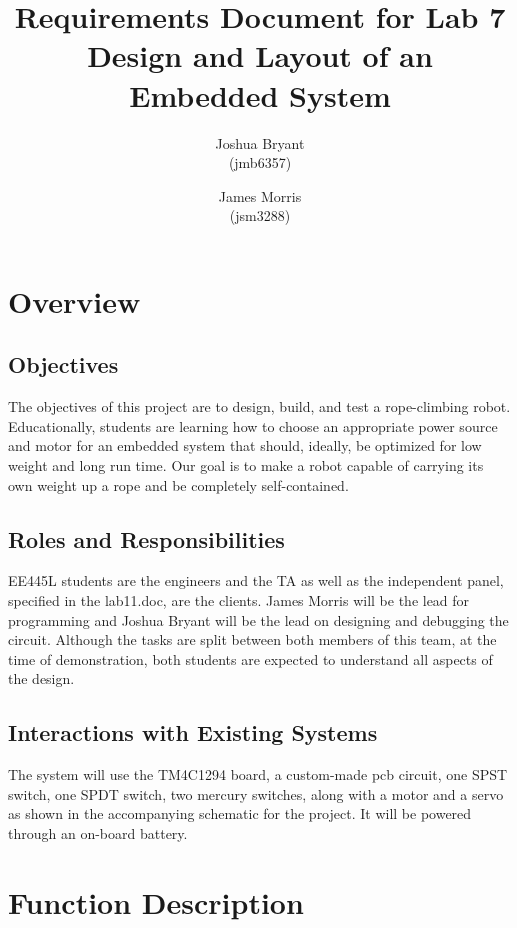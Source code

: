 \documentclass{article}
\begin{document}
\title{Requirements Document for Lab 7 Design and Layout of an Embedded System}
\author{Joshua Bryant\\ (jmb6357) \and James Morris\\ (jsm3288)}

\maketitle

\section{Overview}

	\subsection{Objectives}
		The objectives of this project are to design, build, and test a rope-climbing robot. Educationally, students are learning how to choose an appropriate power source and motor for an embedded system that should, ideally, be optimized for low weight and long run time. Our goal is to make a robot capable of carrying its own weight up a rope and be completely self-contained.
	\subsection{Roles and Responsibilities}
		EE445L students are the engineers and the TA as well as the independent panel, specified in the lab11.doc, are the clients. James Morris will be the lead for programming and Joshua Bryant will be the lead on designing and debugging the circuit. Although the tasks are split between both members of this team, at the time of demonstration, both students are expected to understand all aspects of the design.
	\subsection{Interactions with Existing Systems}
		The system will use the TM4C1294 board, a custom-made pcb circuit, one SPST switch, one SPDT switch, two mercury switches, along with a motor and a servo as shown in the accompanying schematic for the project. It will be powered through an on-board battery.
\section{Function Description}
\end{document}
